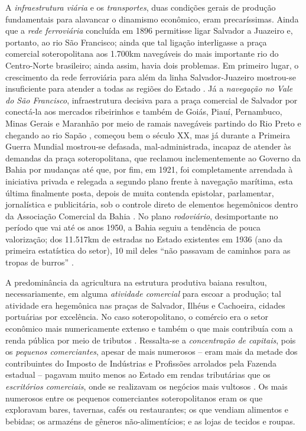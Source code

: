 A \textit{infraestrutura viária} e os \textit{transportes}, duas condições gerais de produção fundamentais para alavancar o dinamismo econômico, eram precaríssimas. Ainda que a \textit{rede ferroviária} concluída em 1896 permitisse ligar Salvador a Juazeiro e, portanto, ao rio São Francisco; ainda que tal ligação interligasse a praça comercial soteropolitana aos 1.700km navegáveis do mais importante rio do Centro-Norte brasileiro; ainda assim, havia dois problemas. Em primeiro lugar, o crescimento da rede ferroviária para além da linha Salvador-Juazeiro mostrou-se insuficiente para atender a todas as regiões do Estado \cite[p.~31]{CPE1980}. Já a \textit{navegação no Vale do São Francisco}, infraestrutura decisiva para a praça comercial de Salvador por conectá-la aos mercados ribeirinhos e também de Goiás, Piauí, Pernambuco, Minas Gerais e Maranhão por meio de ramais navegáveis partindo do Rio Preto e chegando ao rio Sapão \cite[p.~220]{CUNHA2011}, começou bem o século XX, mas já durante a Primeira Guerra Mundial mostrou-se defasada, mal-administrada, incapaz de atender às demandas da praça soteropolitana, que reclamou inclementemente ao Governo da Bahia por mudanças até que, por fim, em 1921, foi completamente arrendada à iniciativa privada e relegada a segundo plano frente à navegação marítima, esta última finalmente posta, depois de muita contenda epistolar, parlamentar, jornalística e publicitária, sob o controle direto de elementos hegemônicos dentro da Associação Comercial da Bahia \cite[p.~221-223]{CUNHA2011}. No plano \textit{rodoviário}, desimportante no período que vai até os anos 1950, a Bahia seguiu a tendência de pouca valorização; dos 11.517km de estradas no Estado existentes em 1936 (ano da primeira estatística do setor), 10 mil deles ``não passavam de caminhos para as tropas de burros'' \cite[p.~31]{CPE1980}.

A predominância da agricultura na estrutura produtiva baiana resultou, necessariamente, em alguma \textit{atividade comercial} para escoar a produção; tal atividade era hegemônica nas praças de Salvador, Ilhéus e Cachoeira, cidades portuárias por excelência. No caso soteropolitano, o comércio era o setor econômico mais numericamente extenso e também o que mais contribuía com a renda pública por meio de tributos \cite[p.~55]{CPE1980}. Ressalta-se a \textit{concentração de capitais}, pois os \textit{pequenos comerciantes}, apesar de mais numerosos -- eram mais da metade dos contribuintes do Imposto de Indústrias e Profissões arrolados pela Fazenda estadual -- pagavam muito menos ao Estado em rendas tributárias que os \textit{escritórios comerciais}, onde se realizavam os negócios mais vultosos \cite[p.~56]{CPE1980}. Os mais numerosos entre os pequenos comerciantes soteropolitanos eram os que exploravam bares, tavernas, cafés ou restaurantes; os que vendiam alimentos e bebidas; os armazéns de gêneros não-alimentícios; e as lojas de tecidos e roupas. 

